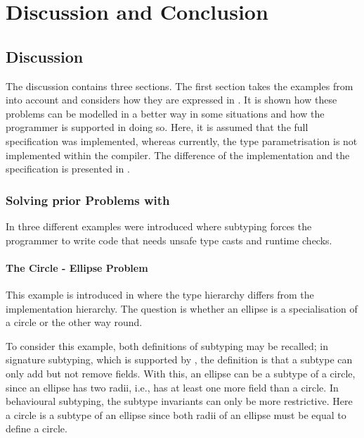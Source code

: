 \chapter{Discussion and Conclusion}
\label{ctr:discussionConclusion}
\section{Discussion}
\label{ctr:discussion}
The discussion contains three sections. The first section takes
the examples from  into account and
considers how they are expressed in \ooplss. It is shown how these
problems can be modelled in a better way in some situations and how the
programmer is supported in doing so. Here, it is assumed that the full
specification was implemented, whereas currently, the type parametrisation is
not implemented within the compiler. The difference of the implementation
and the specification is presented in .

\subsection{Solving prior Problems with \ooplss}
In  three different examples were
introduced where subtyping forces the programmer to write code that
needs unsafe type casts and runtime checks.

\subsubsection{The Circle - Ellipse Problem}
This example is introduced in  where the type
hierarchy differs from the implementation hierarchy. The question is whether an ellipse
is a specialisation of a circle or the other way round.

To consider this example, both definitions of subtyping may be recalled;
in signature subtyping, which is supported by \ooplss, the
definition is that a subtype can only add but not remove fields. With this,
an ellipse can be a subtype of a circle, since an ellipse has two radii,
i.e., has at least one more field than a circle. In behavioural subtyping,
the subtype invariants can only be more restrictive. Here a circle is
a subtype of an ellipse since both radii of an ellipse must be equal
to define a circle.


